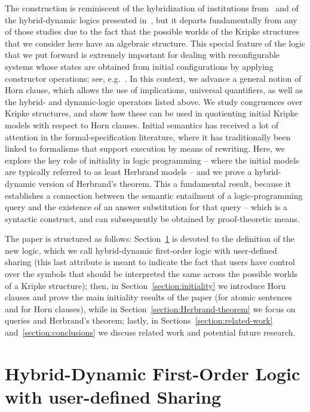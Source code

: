 \documentclass[a4paper,UKenglish,cleveref, autoref]{lipics-v2019}
\begin{document}
The construction is reminiscent of the hybridization of institutions from~\cite{MartinsMDB11,DiaconescuM16} and of the hybrid-dynamic logics presented in~\cite{BohrerP18,HennickerMK19}, but it departs fundamentally from any of those studies due to the fact that the possible worlds of the Kripke structures that we consider here have an algebraic structure.
This special feature of the logic that we put forward is extremely important for dealing with reconfigurable systems whose states are obtained from initial configurations by applying constructor operations; see, e.g.~\cite{GainaTR18}.
In this context, we advance a general notion of Horn clause, which allows the use of implications, universal quantifiers, as well as the hybrid- and dynamic-logic operators listed above.
We study congruences over Kripke structures, and show how these can be used in quotienting initial Kripke models with respect to Horn clauses.
Initial semantics has received a lot of attention in the formal-specification literature, where it has traditionally been linked to formalisms that support execution by means of rewriting.
Here, we explore the key role of initiality in logic programming -- where the initial models are typically referred to as least Herbrand models -- and we prove a hybrid-dynamic version of Herbrand's theorem.
This a fundamental result, because it establishes a connection between the semantic entailment of a logic-programming query and the existence of an answer substitution for that query -- which is a syntactic construct, and can subsequently be obtained by proof-theoretic means.

The paper is structured as follows:
Section~\ref{section:HDFOLS} is devoted to the definition of the new logic, which we call hybrid-dynamic first-order logic with user-defined sharing (this last attribute is meant to indicate the fact that users have control over the symbols that should be interpreted the same across the possible worlds of a Kripke structure);
then, in Section~\ref{section:initiality} we introduce Horn clauses and prove the main initiality results of the paper (for atomic sentences and for Horn clauses), while in Section~\ref{section:Herbrand-theorem} we focus on queries and Herbrand's theorem;
lastly, in Sections~\ref{section:related-work} and~\ref{section:conclusions} we discuss related work and potential future research.


\section{Hybrid-Dynamic First-Order Logic with user-defined Sharing}
\label{section:HDFOLS}
\end{document}
